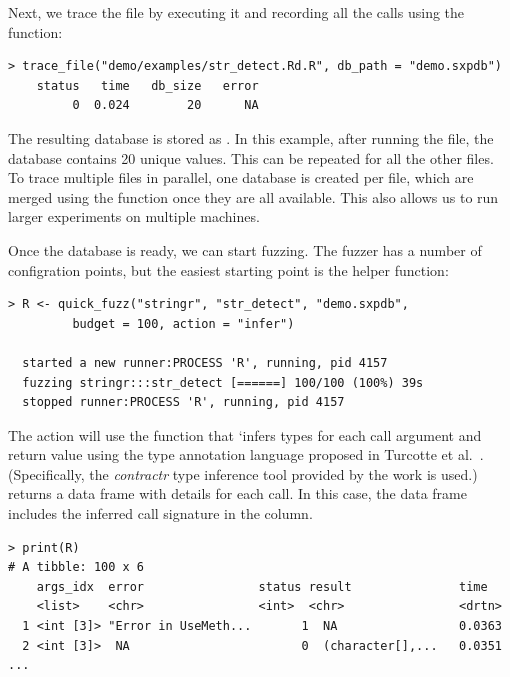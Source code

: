 \documentclass[sigplan,nonacm,anonymous,review]{acmart}
\begin{document}
Next, we trace the file by executing it and recording all the calls using the  function:

\begin{lstlisting}
> trace_file("demo/examples/str_detect.Rd.R", db_path = "demo.sxpdb")
    status   time   db_size   error
         0  0.024        20      NA
\end{lstlisting}

The resulting database is stored as . 
In this example, after running the  file, the database contains 20 unique values. 
This can be repeated for all the other files. 
To trace multiple files in parallel, one database is created per file, which are merged using the  function once they are all available.
This also allows us to run larger experiments on multiple machines.

Once the database is ready, we can start fuzzing.
The fuzzer has a number of configration points, but the easiest starting point is the  helper function:

\begin{lstlisting}
> R <- quick_fuzz("stringr", "str_detect", "demo.sxpdb",
		 budget = 100, action = "infer")

  started a new runner:PROCESS 'R', running, pid 4157
  fuzzing stringr:::str_detect [======] 100/100 (100%) 39s
  stopped runner:PROCESS 'R', running, pid 4157
\end{lstlisting}

The  action will use the  function that `infers types for each call argument and return value using the type annotation language proposed in Turcotte et al.~\cite{turcotte2020designing}.
(Specifically, the \emph{contractr} type inference tool provided by the work is used.)
 returns a data frame with details for each call.
In this case, the data frame includes the inferred call signature in the  column. %

\begin{lstlisting}
> print(R)
# A tibble: 100 x 6
    args_idx  error                status result               time
    <list>    <chr>                <int>  <chr>                <drtn>
  1 <int [3]> "Error in UseMeth...       1  NA                 0.0363
  2 <int [3]>  NA                        0  (character[],...   0.0351
...
\end{lstlisting}
\end{document}

